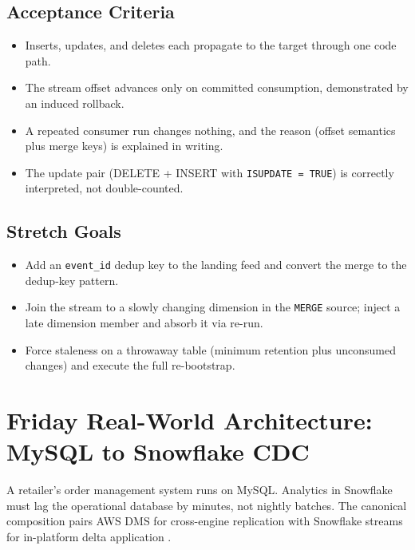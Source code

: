 \subsection*{Acceptance Criteria}
\begin{itemize}
    \item Inserts, updates, and deletes each propagate to the target through one code path.
    \item The stream offset advances only on committed consumption, demonstrated by an induced rollback.
    \item A repeated consumer run changes nothing, and the reason (offset semantics plus merge keys) is explained in writing.
    \item The update pair (DELETE + INSERT with \texttt{ISUPDATE = TRUE}) is correctly interpreted, not double-counted.
\end{itemize}

\subsection*{Stretch Goals}
\begin{itemize}
    \item Add an \texttt{event\_id} dedup key to the landing feed and convert the merge to the dedup-key pattern.
    \item Join the stream to a slowly changing dimension in the \texttt{MERGE} source; inject a late dimension member and absorb it via re-run.
    \item Force staleness on a throwaway table (minimum retention plus unconsumed changes) and execute the full re-bootstrap.
\end{itemize}

\section{Friday Real-World Architecture: MySQL to Snowflake CDC}
A retailer's order management system runs on MySQL. Analytics in Snowflake must lag the operational database by minutes, not nightly batches. The canonical composition pairs AWS DMS for cross-engine replication with Snowflake streams for in-platform delta application \cite{awsDmsDocs}.

